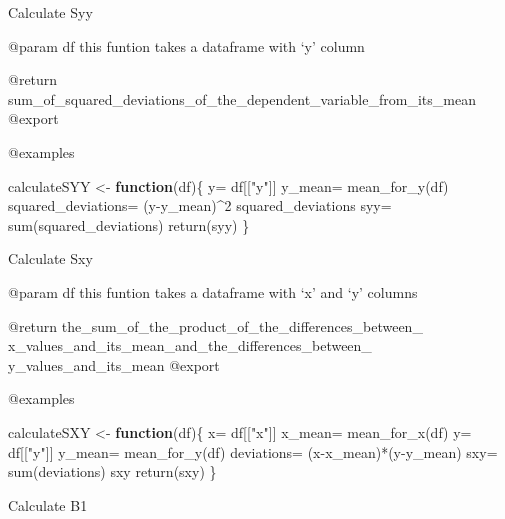 \documentclass[
]{article}
\newenvironment{Shaded}{\begin{snugshade}}{\end{snugshade}}
\newcommand{\ControlFlowTok}[1]{\textcolor[rgb]{0.13,0.29,0.53}{\textbf{#1}}}
\newcommand{\DecValTok}[1]{\textcolor[rgb]{0.00,0.00,0.81}{#1}}
\newcommand{\FunctionTok}[1]{\textcolor[rgb]{0.00,0.00,0.00}{#1}}
\newcommand{\NormalTok}[1]{#1}
\newcommand{\OtherTok}[1]{\textcolor[rgb]{0.56,0.35,0.01}{#1}}
\newcommand{\SpecialCharTok}[1]{\textcolor[rgb]{0.00,0.00,0.00}{#1}}
\newcommand{\StringTok}[1]{\textcolor[rgb]{0.31,0.60,0.02}{#1}}
\begin{document}
Calculate Syy

@param df this funtion takes a dataframe with `y' column

@return
sum\_of\_squared\_deviations\_of\_the\_dependent\_variable\_from\_its\_mean
@export

@examples

\begin{Shaded}
\begin{Highlighting}[]
\NormalTok{calculateSYY }\OtherTok{\textless{}{-}} \ControlFlowTok{function}\NormalTok{(df)\{}
\NormalTok{  y}\OtherTok{=}\NormalTok{ df[[}\StringTok{"y"}\NormalTok{]]}
\NormalTok{  y\_mean}\OtherTok{=} \FunctionTok{mean\_for\_y}\NormalTok{(df)}
\NormalTok{  squared\_deviations}\OtherTok{=}\NormalTok{ (y}\SpecialCharTok{{-}}\NormalTok{y\_mean)}\SpecialCharTok{\^{}}\DecValTok{2}
\NormalTok{  squared\_deviations}
\NormalTok{  syy}\OtherTok{=} \FunctionTok{sum}\NormalTok{(squared\_deviations)}
  \FunctionTok{return}\NormalTok{(syy)}
\NormalTok{\}}
\end{Highlighting}
\end{Shaded}

Calculate Sxy

@param df this funtion takes a dataframe with `x' and `y' columns

@return the\_sum\_of\_the\_product\_of\_the\_differences\_between\_
x\_values\_and\_its\_mean\_and\_the\_differences\_between\_
y\_values\_and\_its\_mean @export

@examples

\begin{Shaded}
\begin{Highlighting}[]
\NormalTok{calculateSXY }\OtherTok{\textless{}{-}} \ControlFlowTok{function}\NormalTok{(df)\{}
\NormalTok{  x}\OtherTok{=}\NormalTok{ df[[}\StringTok{"x"}\NormalTok{]]}
\NormalTok{  x\_mean}\OtherTok{=} \FunctionTok{mean\_for\_x}\NormalTok{(df)}
\NormalTok{  y}\OtherTok{=}\NormalTok{ df[[}\StringTok{"y"}\NormalTok{]]}
\NormalTok{  y\_mean}\OtherTok{=} \FunctionTok{mean\_for\_y}\NormalTok{(df)}
\NormalTok{  deviations}\OtherTok{=}\NormalTok{ (x}\SpecialCharTok{{-}}\NormalTok{x\_mean)}\SpecialCharTok{*}\NormalTok{(y}\SpecialCharTok{{-}}\NormalTok{y\_mean)}
\NormalTok{  sxy}\OtherTok{=} \FunctionTok{sum}\NormalTok{(deviations)}
\NormalTok{  sxy}
  \FunctionTok{return}\NormalTok{(sxy)}
\NormalTok{\}}
\end{Highlighting}
\end{Shaded}

Calculate B1
\end{document}
